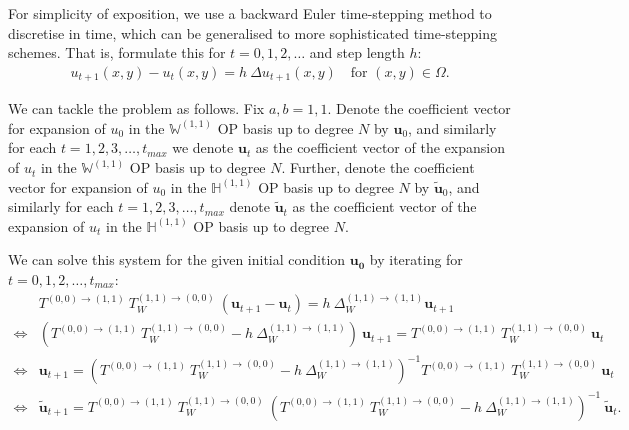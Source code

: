 \documentclass[11pt, oneside]{article}   	%
\newcommand{\hdop}{H}
\newcommand{\Wii}{W^{(1,1)}}
\newcommand{\bighdopii}{{\mathbb{\hdop}^{(1,1)}}}
\newcommand{\laplacewii}{\Delta_W^{(1,1)\to(1,1)}}
\newcommand{\bigWii}{{\mathbb{W}^{(1,1)}}}
\begin{document}
For simplicity of exposition, we use a backward Euler time-stepping method to discretise in time, which can be generalised to more sophisticated time-stepping schemes. That is, formulate this for \(t = 0,1,2,\dots\) and step length $h$:
\begin{align*}
u_{t+1}(x,y) - u_t (x,y) = h \: \Delta u_{t+1}(x,y) \quad \text{for } (x,y) \in \Omega.
\end{align*}

We can tackle the problem as follows. Fix \(a, b = 1,1\). Denote the coefficient vector for expansion of $u_0$ in the $\bigWii$ OP basis up to degree $N$ by $\mathbf{u}_0$, and similarly for each $t = 1,2,3,\dots,t_{max}$ we denote $\mathbf{u}_t$ as the coefficient vector of the expansion of $u_t$ in the $\bigWii$ OP basis up to degree $N$. Further, denote the coefficient vector for expansion of $u_0$ in the $\bighdopii$ OP basis up to degree $N$ by $\mathbf{\tilde{u}}_0$, and similarly for each $t = 1,2,3,\dots,t_{max}$ denote $\mathbf{\tilde{u}}_t$ as the coefficient vector of the expansion of $u_t$ in the $\bighdopii$ OP basis up to degree $N$.

We can solve this system for the given initial condition $\mathbf{u_0}$ by iterating for $t = 0,1,2,\dots,t_{max}$:
\begin{align*}
	&T^{(0,0)\to(1,1)} \: T_W^{(1,1)\to(0,0)} \: (\mathbf{u}_{t+1} - \mathbf{u}_t) = h \: \laplacewii \mathbf{u}_{t+1} \nonumber \\
	\iff& (T^{(0,0)\to(1,1)} \:T_W^{(1,1)\to(0,0)} - h \: \laplacewii) \: \mathbf{u}_{t+1} = T^{(0,0)\to(1,1)} \: T_W^{(1,1)\to(0,0)} \: \mathbf{u}_t \nonumber \\
	\iff& \mathbf{u}_{t+1} = (T^{(0,0)\to(1,1)} \: T_W^{(1,1)\to(0,0)} - h \: \laplacewii)^{-1} T^{(0,0)\to(1,1)} \: T_W^{(1,1)\to(0,0)} \: \mathbf{u}_t \nonumber \\
	\iff& \mathbf{\tilde{u}}_{t+1} = T^{(0,0)\to(1,1)} \: T_W^{(1,1)\to(0,0)} \: (T^{(0,0)\to(1,1)} \: T_W^{(1,1)\to(0,0)} - h \: \laplacewii)^{-1} \: \mathbf{\tilde{u}}_t.
\end{align*}

\end{document}
